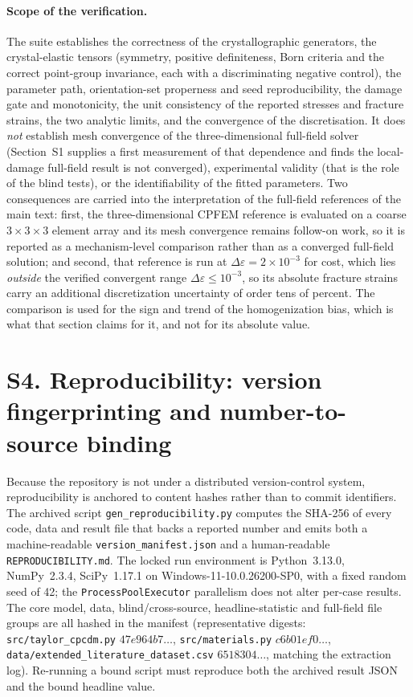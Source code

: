 \documentclass[11pt,a4paper,twocolumn]{article}
\begin{document}
\paragraph{Scope of the verification.} The suite establishes the correctness of the crystallographic
generators, the crystal-elastic tensors (symmetry, positive definiteness, Born criteria and the correct
point-group invariance, each with a discriminating negative control), the parameter path, orientation-set
properness and seed reproducibility, the damage gate and monotonicity, the unit consistency of the
reported stresses and fracture strains, the two analytic limits, and the convergence of the
discretisation. It does \emph{not} establish mesh convergence of the three-dimensional full-field solver (Section~S1 supplies a first measurement of that dependence and finds the local-damage full-field result is not converged),
experimental validity (that is the role of the blind tests), or the identifiability of the fitted
parameters. Two consequences are carried into the interpretation of the full-field references of
the main text: first, the three-dimensional CPFEM reference is evaluated on a coarse
$3\times3\times3$ element array and its mesh convergence remains follow-on work, so it is reported as a
mechanism-level comparison rather than as a converged full-field solution; and second, that reference is
run at $\Delta\varepsilon = 2\times10^{-3}$ for cost, which lies \emph{outside} the verified convergent
range $\Delta\varepsilon \le 10^{-3}$, so its absolute fracture strains carry an additional
discretization uncertainty of order tens of percent. The comparison is used for the sign and trend of the
homogenization bias, which is what that section claims for it, and not for its absolute value.

\section*{S4. Reproducibility: version fingerprinting and number-to-source binding}

Because the repository is not under a distributed version-control system, reproducibility is anchored to
content hashes rather than to commit identifiers. The archived script \texttt{gen\_reproducibility.py}
computes the SHA-256 of every code, data and result file that backs a reported number and emits both a
machine-readable \texttt{version\_manifest.json} and a human-readable \texttt{REPRODUCIBILITY.md}. The locked
run environment is Python~3.13.0, NumPy~2.3.4, SciPy~1.17.1 on Windows-11-10.0.26200-SP0, with a fixed
random seed of 42; the \texttt{ProcessPoolExecutor} parallelism does not alter per-case results. The core
model, data, blind/cross-source, headline-statistic and full-field file groups are all hashed in the
manifest (representative digests: \texttt{src/taylor\_cpcdm.py} $47e964b7\ldots$, \texttt{src/materials.py}
$c6b01ef0\ldots$, \texttt{data/extended\_literature\_dataset.csv} $6518304\ldots$, matching the extraction
log). Re-running a bound script must reproduce both the archived result JSON and the bound headline value.
\end{document}
